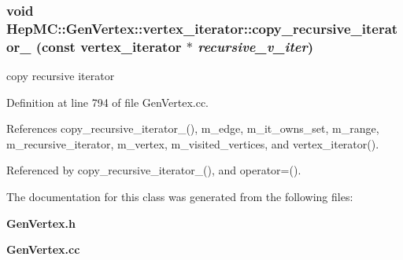 \subsubsection{\setlength{\rightskip}{0pt plus 5cm}void Hep\-MC::Gen\-Vertex::vertex\_\-iterator::copy\_\-recursive\_\-iterator\_\- (const {\bf vertex\_\-iterator} $\ast$ {\em recursive\_\-v\_\-iter})\hspace{0.3cm}{\tt  [protected]}}\label{classHepMC_1_1GenVertex_1_1vertex__iterator_976cad12c2d24f99bba14a67a702a030}


copy recursive iterator 



Definition at line 794 of file Gen\-Vertex.cc.

References copy\_\-recursive\_\-iterator\_\-(), m\_\-edge, m\_\-it\_\-owns\_\-set, m\_\-range, m\_\-recursive\_\-iterator, m\_\-vertex, m\_\-visited\_\-vertices, and vertex\_\-iterator().

Referenced by copy\_\-recursive\_\-iterator\_\-(), and operator=().

The documentation for this class was generated from the following files:\begin{CompactItemize}
\item 
{\bf Gen\-Vertex.h}\item 
{\bf Gen\-Vertex.cc}\end{CompactItemize}
